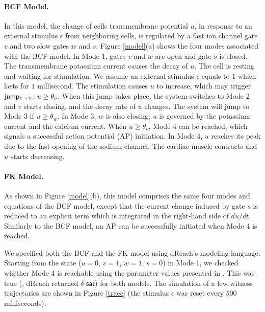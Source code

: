 \paragraph{BCF Model.} 
In this model, the change of cells transmembrane potential $u$, in response to an external stimulus $\epsilon$ from neighboring cells, is regulated by a fast ion channel gate $v$ and two slow gates $w$ and $s$.
Figure \ref{model}(a) shows the four modes associated with the BCF model. In Mode $1$, gates $v$ and $w$ are open and gate $s$ is closed. The transmembrane potassium current causes the decay of $u$. The cell is resting and waiting for stimulation. We assume an external stimulus $\epsilon$ equals to $1$ which lasts for $1$ millisecond. The stimulation causes $u$ to increase, which may trigger $\mathsf{jump}_{1 \rightarrow 2}: u \geq \theta_o$. When this jump takes place, the system switches to Mode 2 and $v$ starts closing, and the decay rate of $u$ changes. The system will jump to Mode 3 if $u \geq \theta_w$. In Mode 3, $w$ is also closing; $u$ is governed by the potassium current and the calcium current. When $u \geq \theta_v$, Mode 4 can be reached, which signals a successful action potential (AP) initiation. In Mode 4, $u$ reaches its peak due to the fast opening of the sodium channel. The cardiac muscle contracts and $u$ starts decreasing. 

\paragraph{FK Model.} 
As shown in Figure \ref{model}(b), this model comprises the same four modes and equations of the BCF model, except that the current change induced by gate $s$ is reduced to an explicit term which is integrated
in the right-hand side of $du/dt$. Similarly to the BCF model, an AP can be successfully initiated when Mode 4 is reached. 

We specified both the BCF and the FK model using dReach's modeling language. Starting from the state ($u = 0$, $v = 1$, $w = 1$, $s = 0$) in Mode 1, we checked whether Mode 4 is reachable using the parameter values presented in \cite{orovio08}. This was true (\ie, dReach returned $\delta$-$\mathsf{sat}$) for both models. 
The simulation of a few witness trajectories are shown in Figure \ref{trace} (the stimulus $\epsilon$ was reset every $500$ milliseconds).


